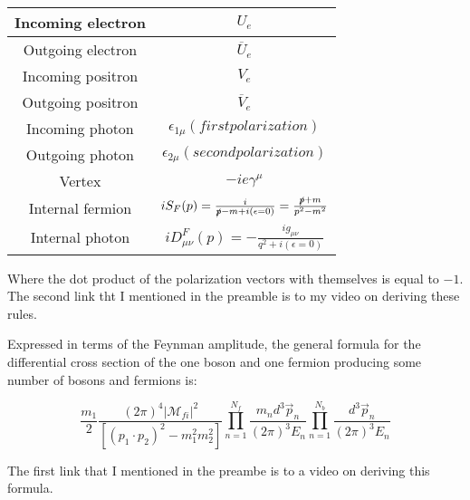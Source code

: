 \documentclass[a4]{article}
\begin{document}
    \begin{center}
        \begin{tabular}[center]{|c|c|}
            \hline
            Incoming electron & $U_{e}$ \\
            \hline
            Outgoing electron & $\overline{U}_{e}$ \\
            \hline
            Incoming positron & $V_{e}$ \\
            \hline
            Outgoing positron & $\overline{V}_{e}$ \\
            \hline
            Incoming photon & $\epsilon_{1 \mu} (first polarization)$ \\
            \hline
            Outgoing photon & $\epsilon_{2 \mu} (second polarization)$ \\
            \hline
            Vertex & $-i e \gamma^{\mu}$ \\
            \hline
            Internal fermion & $i S_{F} (p) = \frac{i}{\slashed{p} - m + i (\epsilon = 0)} = \frac{\slashed{p} + m}{p^2 - m^2}$ \\
            \hline
            Internal photon & $i D^{F}_{\mu \nu} (p) = - \frac{i g_{\mu \nu}}{q^2 + i(\epsilon = 0)}$ \\
            \hline
        \end{tabular}
    \end{center}

    Where the dot product of the polarization vectors with themselves is equal to $-1$. The second link tht I mentioned in the preamble
    is to my video on deriving these rules.

    Expressed in terms of the Feynman amplitude, the general formula for the differential cross section of the one boson and one 
    fermion producing some number of bosons and fermions is:

    \begin{center}
        \begin{framed}
            \begin{equation}
                \frac{m_1}{2} \frac{(2 \pi)^4 |\mathscr{M}_{fi}|^2}{[(p_1 \cdot p_2)^2 - m_1^2 m_2^2]} \prod_{n = 1}^{N_f} \frac{m_n d^3 \vec{p}_n}{(2 \pi)^3 E_n} \prod_{n = 1}^{N_b} \frac{d^3 \vec{p}_n}{(2 \pi)^3 E_n}
            \end{equation}
        \end{framed}
    \end{center}

    The first link that I mentioned in the preambe is to a video on deriving this formula.
\end{document}
